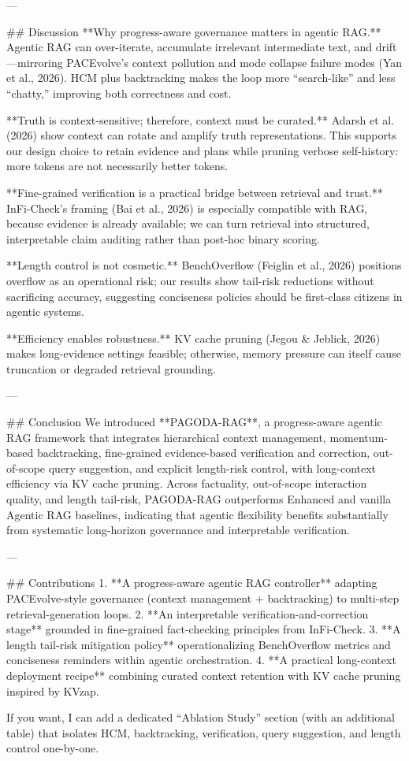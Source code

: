 ---

## Discussion  
**Why progress-aware governance matters in agentic RAG.** Agentic RAG can over-iterate, accumulate irrelevant intermediate text, and drift—mirroring PACEvolve’s context pollution and mode collapse failure modes (Yan et al., 2026). HCM plus backtracking makes the loop more “search-like” and less “chatty,” improving both correctness and cost.

**Truth is context-sensitive; therefore, context must be curated.** Adarsh et al. (2026) show context can rotate and amplify truth representations. This supports our design choice to retain evidence and plans while pruning verbose self-history: more tokens are not necessarily better tokens.

**Fine-grained verification is a practical bridge between retrieval and trust.** InFi-Check’s framing (Bai et al., 2026) is especially compatible with RAG, because evidence is already available; we can turn retrieval into structured, interpretable claim auditing rather than post-hoc binary scoring.

**Length control is not cosmetic.** BenchOverflow (Feiglin et al., 2026) positions overflow as an operational risk; our results show tail-risk reductions without sacrificing accuracy, suggesting conciseness policies should be first-class citizens in agentic systems.

**Efficiency enables robustness.** KV cache pruning (Jegou & Jeblick, 2026) makes long-evidence settings feasible; otherwise, memory pressure can itself cause truncation or degraded retrieval grounding.

---

## Conclusion  
We introduced **PAGODA-RAG**, a progress-aware agentic RAG framework that integrates hierarchical context management, momentum-based backtracking, fine-grained evidence-based verification and correction, out-of-scope query suggestion, and explicit length-risk control, with long-context efficiency via KV cache pruning. Across factuality, out-of-scope interaction quality, and length tail-risk, PAGODA-RAG outperforms Enhanced and vanilla Agentic RAG baselines, indicating that agentic flexibility benefits substantially from systematic long-horizon governance and interpretable verification.

---

## Contributions  
1. **A progress-aware agentic RAG controller** adapting PACEvolve-style governance (context management + backtracking) to multi-step retrieval-generation loops.  
2. **An interpretable verification-and-correction stage** grounded in fine-grained fact-checking principles from InFi-Check.  
3. **A length tail-risk mitigation policy** operationalizing BenchOverflow metrics and conciseness reminders within agentic orchestration.  
4. **A practical long-context deployment recipe** combining curated context retention with KV cache pruning inspired by KVzap.  

If you want, I can add a dedicated “Ablation Study” section (with an additional table) that isolates HCM, backtracking, verification, query suggestion, and length control one-by-one.